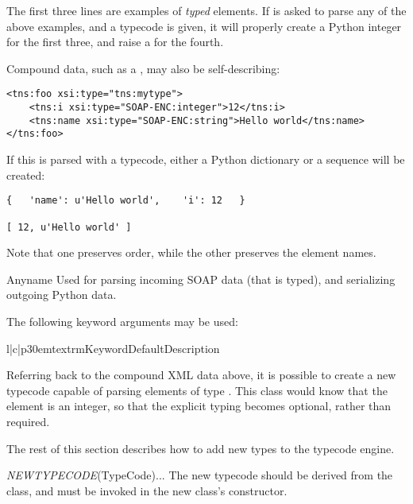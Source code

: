 The first three lines are examples of \emph{typed} elements.
If \ZSI{} is asked to parse any of the above examples, and a
 typecode is given, it will properly create a Python
integer for the first three, and raise a 
for the fourth.

Compound data, such as a , may also be self-describing:
\begin{verbatim}
<tns:foo xsi:type="tns:mytype">
    <tns:i xsi:type="SOAP-ENC:integer">12</tns:i>
    <tns:name xsi:type="SOAP-ENC:string">Hello world</tns:name>
</tns:foo>
\end{verbatim}

If this is parsed with a  typecode, either a Python dictionary
or a sequence will be created:
\begin{verbatim}
{   'name': u'Hello world',    'i': 12   }

[ 12, u'Hello world' ]
\end{verbatim}
Note that one preserves order, while the other preserves the element names.

\begin{classdesc}{Any}{name}
Used for parsing incoming SOAP data (that is typed), and serializing
outgoing Python data.

The following keyword arguments may be used:

\begin{tableiii}{l|c|p{30em}}{textrm}{Keyword}{Default}{Description}
\end{tableiii}
\end{classdesc}

Referring back to the compound XML data above, it is possible to create a new
typecode capable of parsing elements of type .
This class would know that the  element is an integer,
so that the explicit typing becomes optional, rather than required.

The rest of this section describes how to add new
types to the \ZSI{} typecode engine.

\begin{classdesc}{\emph{NEWTYPECODE}(TypeCode)}{...}
The new typecode should be derived from the  class, and
 must be invoked in the new class's constructor.
\end{classdesc}

